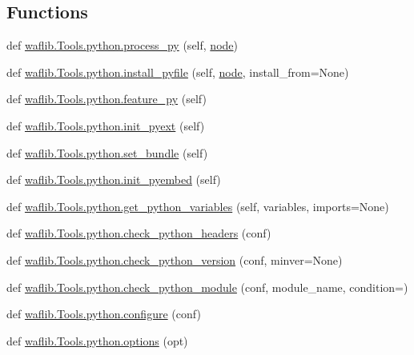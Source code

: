 \subsection*{Functions}
\begin{DoxyCompactItemize}
\item 
def \hyperlink{namespacewaflib_1_1_tools_1_1python_a71636ae0482b95c564b6d4187d0859e2}{waflib.\+Tools.\+python.\+process\+\_\+py} (self, \hyperlink{structnode}{node})
\item 
def \hyperlink{namespacewaflib_1_1_tools_1_1python_a058abbc5b39435a0b9e521b2c7469b0e}{waflib.\+Tools.\+python.\+install\+\_\+pyfile} (self, \hyperlink{structnode}{node}, install\+\_\+from=None)
\item 
def \hyperlink{namespacewaflib_1_1_tools_1_1python_acc4f408ad28420fd71f5d55e8460c860}{waflib.\+Tools.\+python.\+feature\+\_\+py} (self)
\item 
def \hyperlink{namespacewaflib_1_1_tools_1_1python_adfd20f1acfdfb23e2a6835e8f46380d8}{waflib.\+Tools.\+python.\+init\+\_\+pyext} (self)
\item 
def \hyperlink{namespacewaflib_1_1_tools_1_1python_a8871401a5a253c6c5f23b93abfc7c6ce}{waflib.\+Tools.\+python.\+set\+\_\+bundle} (self)
\item 
def \hyperlink{namespacewaflib_1_1_tools_1_1python_a57ee91575ef5da03257f030eeda97eb8}{waflib.\+Tools.\+python.\+init\+\_\+pyembed} (self)
\item 
def \hyperlink{namespacewaflib_1_1_tools_1_1python_a25e6fedc3ee179a0fd6941d4b9a4dc59}{waflib.\+Tools.\+python.\+get\+\_\+python\+\_\+variables} (self, variables, imports=None)
\item 
def \hyperlink{namespacewaflib_1_1_tools_1_1python_a02a439285fad316b6be47a63235641e6}{waflib.\+Tools.\+python.\+check\+\_\+python\+\_\+headers} (conf)
\item 
def \hyperlink{namespacewaflib_1_1_tools_1_1python_a384089b6d673ce03705110abb0b572c8}{waflib.\+Tools.\+python.\+check\+\_\+python\+\_\+version} (conf, minver=None)
\item 
def \hyperlink{namespacewaflib_1_1_tools_1_1python_a72e73914976ccc85f0013225e2fa0a3c}{waflib.\+Tools.\+python.\+check\+\_\+python\+\_\+module} (conf, module\+\_\+name, condition=\textquotesingle{}\textquotesingle{})
\item 
def \hyperlink{namespacewaflib_1_1_tools_1_1python_a4c940b786ec6ccb9dfbe0ad259793f85}{waflib.\+Tools.\+python.\+configure} (conf)
\item 
def \hyperlink{namespacewaflib_1_1_tools_1_1python_a1729b5b9d6f6a5972667bc5d2d1c5f0b}{waflib.\+Tools.\+python.\+options} (opt)
\end{DoxyCompactItemize}
